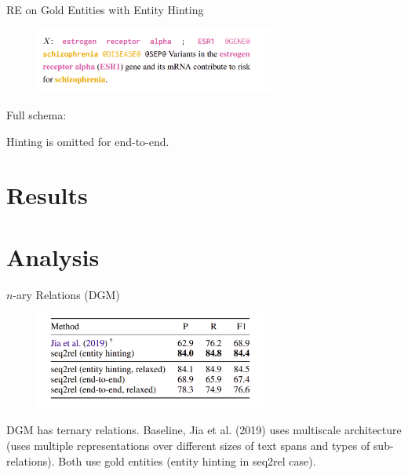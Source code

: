 \documentclass[usenames,dvipsnames,pdf]{beamer}
\begin{document}
        
        \begin{frame}{RE on Gold Entities with Entity Hinting}
          \begin{figure}
            \includegraphics[width=0.7\textwidth,height=0.7\textheight,keepaspectratio]{entity_hint} 
          \end{figure}

          Full schema:

          \begin{adjustbox}{varwidth=\linewidth}%
            \small{}

            
            \small{}
            

            \small{}
          \end{adjustbox}



          
          Hinting is omitted for end-to-end.
        \end{frame}

        
        
        \section{Results}

        
        
        \section{Analysis}


        \begin{frame}{$n$-ary Relations (DGM)}
          \begin{figure}
            \includegraphics[width=0.7\textwidth,height=0.7\textheight,keepaspectratio]{DGM_n_ary_comparison} 
          \end{figure}
          DGM has ternary relations. Baseline, Jia et al. (2019) uses multiscale architecture
          (uses multiple representations over different sizes of text spans and types of sub-relations).
          Both use gold entities (entity hinting in seq2rel case).
        \end{frame}
\end{document}
